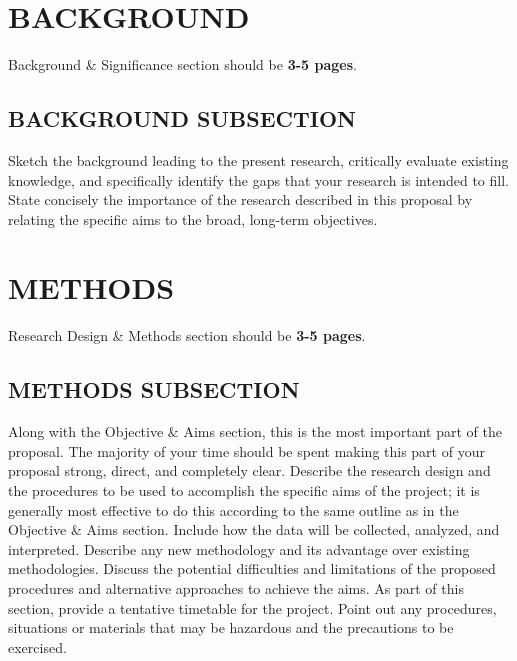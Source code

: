\documentclass[12pt, lettersize]{article}
\begin{document}
\section{BACKGROUND}
Background \& Significance section should be \textbf{3-5 pages}.

\subsection{BACKGROUND SUBSECTION}
\noindent Sketch the background leading to the present research, critically evaluate existing knowledge, and
specifically identify the gaps that your research is intended to fill. State concisely the importance of the
research described in this proposal by relating the specific aims to the broad, long-term objectives.

\section{METHODS} \label{section:methods}
Research Design \& Methods section should be \textbf{3-5 pages}.

\subsection{METHODS SUBSECTION}
\noindent Along with the Objective \& Aims section, this is the most important part of the proposal. The majority of
your time should be spent making this part of your proposal strong, direct, and completely clear. Describe
the research design and the procedures to be used to accomplish the specific aims of the project; it is
generally most effective to do this according to the same outline as in the Objective \& Aims section. Include
how the data will be collected, analyzed, and interpreted. Describe any new methodology and its advantage
over existing methodologies. Discuss the potential difficulties and limitations of the proposed procedures
and alternative approaches to achieve the aims. As part of this section, provide a tentative timetable for the
project. Point out any procedures, situations or materials that may be hazardous and the precautions to be
exercised.

\end{document}
